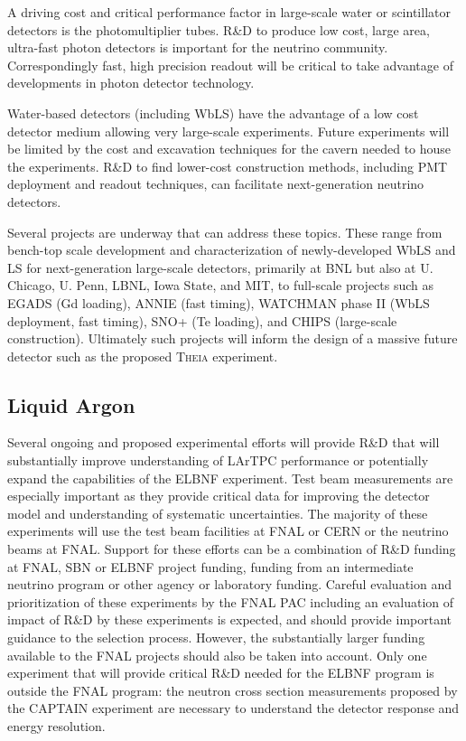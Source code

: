 A driving cost and critical performance factor in large-scale water or scintillator detectors is the 
photomultiplier tubes. R\&D to produce low cost, large area, ultra-fast photon detectors is important for 
the neutrino community. Correspondingly fast, high precision readout will be critical to take advantage of 
developments in photon detector technology.

Water-based detectors (including WbLS) have the advantage of a low cost detector medium allowing 
very large-scale experiments. Future experiments will be limited by the cost and excavation techniques 
for the cavern needed to house the experiments. R\&D to find lower-cost construction methods, including 
PMT deployment and readout techniques, can facilitate next-generation neutrino detectors.

Several projects are underway that can address these topics. These range from bench-top scale 
development and characterization of newly-developed WbLS and LS for next-generation large-scale detectors, primarily at BNL but also at U. Chicago, U. Penn, LBNL, Iowa State, 
and MIT, to full-scale projects such as EGADS (Gd loading), ANNIE (fast timing), WATCHMAN phase II 
(WbLS deployment, fast timing), SNO+ (Te loading), and CHIPS (large-scale construction). Ultimately 
such projects will inform the design of a massive future detector such as the proposed \textsc{Theia} 
experiment.


\subsection{Liquid Argon}

Several ongoing and proposed experimental efforts will provide R\&D that will 
substantially improve understanding of LArTPC performance or potentially expand the 
capabilities of the ELBNF experiment. Test beam measurements are especially important as they 
provide critical data for improving the detector model and understanding of systematic uncertainties. 
The majority of these experiments will use the test beam facilities at FNAL or CERN or the neutrino 
beams at FNAL. Support for these efforts can be a combination of R\&D funding at FNAL, SBN or 
ELBNF project funding, funding from an intermediate neutrino program or other agency or laboratory funding. 
Careful evaluation and prioritization of these experiments by the FNAL PAC including an evaluation of 
impact of R\&D by these experiments is expected, and should provide important guidance to the 
selection process. However, the substantially larger funding available to the FNAL projects should also 
be taken into account. Only one experiment that will provide critical R\&D needed for the ELBNF 
program is outside the FNAL program: the neutron cross section measurements proposed by the 
CAPTAIN experiment are necessary to understand the detector response and energy resolution.

